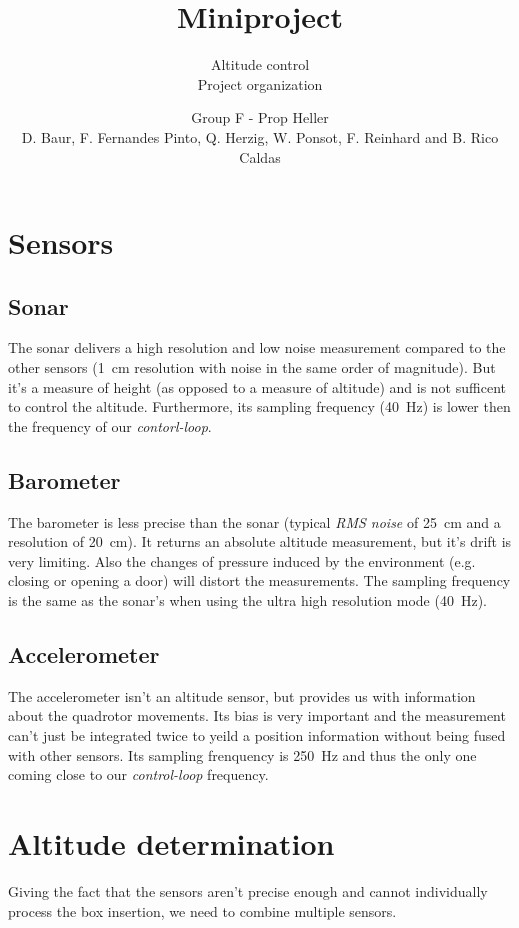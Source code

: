 \documentclass{repMobRob}
\author{Group F - Prop Heller \\ D. Baur, F. Fernandes Pinto, Q. Herzig, W. Ponsot, F. Reinhard and B. Rico Caldas}
\title{Miniproject}
\subtitle{Altitude control \\ \small{Project organization}}
\begin{document}
\thispagestyle{empty}
\maketitle

\section{Sensors}
\subsection{Sonar}
The sonar delivers a high resolution and low noise measurement compared to the other sensors (\SI{1}{\centi\meter} resolution with noise in the same order of magnitude).
But it's a measure of height (as opposed to a measure of altitude) and is not sufficent to control the altitude.
Furthermore, its sampling frequency (\SI{40}{\hertz}) is lower then the frequency of our \emph{contorl-loop}.

\subsection{Barometer}
The barometer is less precise than the sonar (typical \emph{RMS noise} of \SI{25}{\centi\meter} and a resolution of \SI{20}{\centi\meter}).
It returns an absolute altitude measurement, but it's drift is very limiting.
Also the changes of pressure induced by the environment (e.g. closing or opening a door) will distort the measurements.
The sampling frequency is the same as the sonar's when using the ultra high resolution mode (\SI{40}{\hertz}).

\subsection{Accelerometer}
The accelerometer isn't an altitude sensor, but provides us with information about the quadrotor movements.
Its bias is very important and the measurement can't just be integrated twice to yeild a position information without being fused with other sensors.
Its sampling frenquency is \SI{250}{\hertz} and thus the only one coming close to our \emph{control-loop} frequency. 

\section{Altitude determination}
Giving the fact that the sensors aren’t precise enough and cannot individually process the box insertion, we need to combine multiple sensors. 
\end{document}
